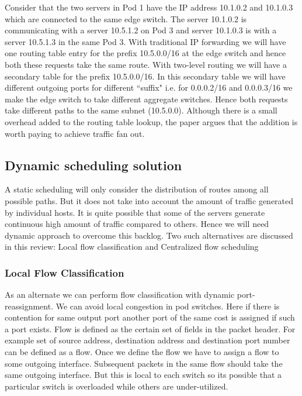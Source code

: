 \documentclass[11pt,letterpaper,onecolumn]{article}
\begin{document}
\par{ Consider that the two servers in Pod 1 have the IP address 10.1.0.2 and 10.1.0.3 which are connected to the same edge switch. The server 10.1.0.2 is communicating with a server 10.5.1.2 on Pod 3 and server 10.1.0.3 is with a server 10.5.1.3  in the same Pod 3. With traditional IP forwarding we will have one routing table entry for the prefix 10.5.0.0/16 at the edge switch and hence both these requests take the same route. With two-level routing we will have a secondary table for the prefix 10.5.0.0/16. In this secondary table we will have different outgoing ports for different ``suffix" i.e. for 0.0.0.2/16 and 0.0.0.3/16 we make the edge switch to take different aggregate switches. Hence both requests take different paths to the same subnet (10.5.0.0). Although there is a small overhead added to the routing table lookup, the paper argues that the addition is worth paying to achieve traffic fan out.}\\

\subsection{Dynamic scheduling solution}
\par{\qquad A static scheduling will only consider the distribution of routes among all possible paths. But it does not take into account the amount of traffic generated by individual hosts. It is quite possible that some of the servers generate continuous high amount of traffic compared to others. Hence we will need dynamic approach to overcome this backlog. Two such alternatives are discussed in this review: Local flow classification and Centralized flow scheduling}\\

\subsubsection{Local Flow Classification}
\par{ \qquad As an alternate we can perform flow classification with dynamic port-reassignment. We can avoid local congestion in pod switches. Here if there is contention for same output port another port of the same cost is assigned if such a port exists. Flow is defined as the certain set of fields in the packet header. For example set of source address, destination address and destination port number can be defined as a flow. Once we define the flow we have to assign a flow to some outgoing interface. Subsequent packets in the same flow should take the same outgoing interface. But this is local to each switch so its possible that a particular switch is overloaded while others are under-utilized.}\\
\end{document}
